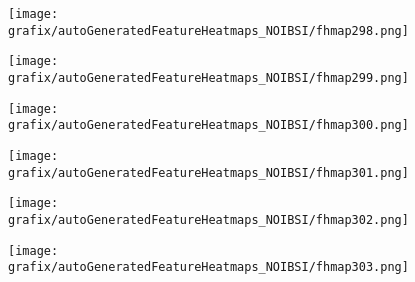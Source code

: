 \hspace{\hsp} 
\begin{subfigure}{\wid\textwidth} 
    \centering 
    \caption{\tiny \sffamily {}} 
    \vspace{\vsp} 
    \texttt{[image: grafix/autoGeneratedFeatureHeatmaps\_NOIBSI/fhmap298.png]} 
\end{subfigure} 
\hspace{\hsp} 
\begin{subfigure}{\wid\textwidth} 
    \centering 
    \caption{\tiny \sffamily {}} 
    \vspace{\vsp} 
    \texttt{[image: grafix/autoGeneratedFeatureHeatmaps\_NOIBSI/fhmap299.png]} 
\end{subfigure} 
\hspace{\hsp} 
\begin{subfigure}{\wid\textwidth} 
    \centering 
    \caption{\tiny \sffamily {}} 
    \vspace{\vsp} 
    \texttt{[image: grafix/autoGeneratedFeatureHeatmaps\_NOIBSI/fhmap300.png]} 
\end{subfigure} 
\hspace{\hsp} 
\begin{subfigure}{\wid\textwidth} 
    \centering 
    \caption{\tiny \sffamily {}} 
    \vspace{\vsp} 
    \texttt{[image: grafix/autoGeneratedFeatureHeatmaps\_NOIBSI/fhmap301.png]} 
\end{subfigure} 
\hspace{\hsp} 
\begin{subfigure}{\wid\textwidth} 
    \centering 
    \caption{\tiny \sffamily {}} 
    \vspace{\vsp} 
    \texttt{[image: grafix/autoGeneratedFeatureHeatmaps\_NOIBSI/fhmap302.png]} 
\end{subfigure} 
\hspace{\hsp} 
\begin{subfigure}{\wid\textwidth} 
    \centering 
    \caption{\tiny \sffamily {}} 
    \vspace{\vsp} 
    \texttt{[image: grafix/autoGeneratedFeatureHeatmaps\_NOIBSI/fhmap303.png]} 
\end{subfigure} 
\hspace{\hsp} 
